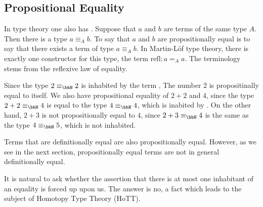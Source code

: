 \subsection{Propositional Equality}


In type theory one also has .  Suppose that $a$ and $b$ are terms of the same type $A$.  Then there is a type  $a \equiv_A b$.  To say that $a$ and $b$ are propositionally equal is to say that there exists a term of type $a \equiv_A b$.    In Martin-Löf type theory, there is exactly one constructor for this type, the term $\text{refl} : a =_A a$.    The terminology stems from the reflexive law of equality. 


Since  the type $2 \equiv_\bbN 2$ is inhabited by the term , The number 2 is propositinally equal to itself.  We also have propositional equality of $2 + 2$ and $4$, since the type $2 + 2 \equiv_\bbN 4$ is equal to the type $4 \equiv_\bbN 4$, which is inabited by .  On the other hand, $2 + 3$ is not propositionally equal to $4$, since $2 + 3 \equiv_\bbN 4$ is the same as the type $4 \equiv_\bbN 5$, which is not inhabited.

Terms that are definitionally equal are also propositionally equal.  However, as we see in the next section, propositionally equal terms are not in general definitionally equal.

It is natural to ask whether the assertion that there is at most one inhabitant of an equality is forced up upon us.  The answer is no, a fact which leads to the subject of Homotopy Type Theory (HoTT).


